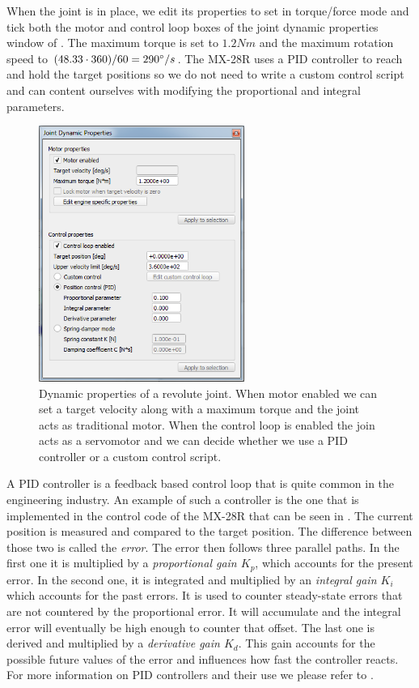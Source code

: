 When the joint is in place, we edit its properties to set in torque/force mode and tick both the motor and control loop boxes of the joint dynamic properties window of . The maximum torque is set to $1.2Nm$ and the maximum rotation speed to $(48.33 \cdot 360) / 60 = 290 \degree/s$. The MX-28R uses a PID controller to reach and hold the target positions so we do not need to write a custom control script and can content ourselves with modifying the proportional and integral parameters. 

\begin{figure}[htp]
\center
    \includegraphics[width = 0.6\textwidth]{figures/joint}
    \caption[Dynamic properties of a revolute joint]{Dynamic properties of a revolute joint. When motor enabled we can set a target velocity along with a maximum torque and the joint acts as traditional motor. When the control loop is enabled the join acts as a servomotor and we can decide whether we use a PID controller or a custom control script.}
    \label{fig:joint}
\end{figure}

A PID controller is a feedback based control loop that is quite common in the engineering industry. An example of such a controller is the one that is implemented in the control code of the MX-28R that can be seen in . The current position is measured and compared to the target position. The difference between those two is called the \emph{error}. The error then follows three parallel paths. In the first one it is multiplied by a \emph{proportional gain $K_p$}, which accounts for the present error. In the second one, it is integrated and multiplied by an \emph{integral gain $K_i$} which accounts for the past errors. It is used to counter steady-state errors that are not countered by the proportional error. It will accumulate and the integral error will eventually be high enough to counter that offset. The last one is derived and multiplied by a \emph{derivative gain $K_d$}. This gain accounts for the possible future values of the error and influences how fast the controller reacts. For more information on PID controllers and their use we please refer to \cite{johnson2005pid}.

